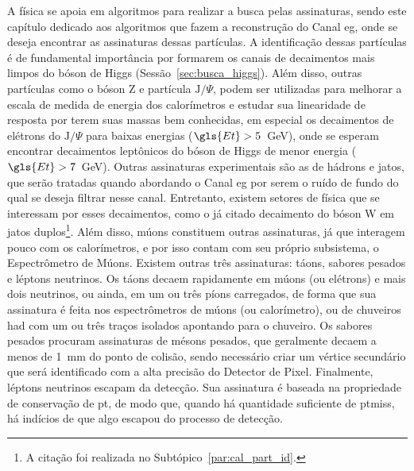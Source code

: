 A física se apoia em algoritmos
para realizar a busca pelas assinaturas, sendo este capítulo dedicado aos
algoritmos que fazem a reconstrução do Canal \gls{eg},
onde se deseja encontrar as assinaturas dessas partículas. A identificação
dessas partículas é de fundamental importância por formarem os canais de
decaimentos mais limpos do bóson de Higgs (Sessão~\ref{sec:busca_higgs}). Além
disso, outras partículas como o bóson Z e partícula $\text{J}/\Psi$, podem ser
utilizadas para melhorar a escala de medida de energia dos calorímetros e
estudar sua linearidade de resposta por terem suas massas bem conhecidas, 
em especial os decaimentos de elétrons do
$\text{J}/\Psi$ para baixas energias ($\gls{Et} > 5$~GeV), onde se esperam encontrar 
decaimentos leptônicos do bóson de Higgs de menor energia ($\gls{Et} > 7$~GeV).
Outras assinaturas experimentais são as de hádrons e jatos, que serão tratadas
quando abordando o Canal \gls{eg} por serem o ruído de fundo do qual se deseja
filtrar nesse canal. Entretanto, existem setores de física que se
interessam por esses decaimentos, como o já citado decaimento do bóson W em jatos
duplos\footnote{A citação foi realizada no Subtópico~\ref{par:cal_part_id}.}. 
Além disso, múons constituem outras assinaturas, já que interagem
pouco com os calorímetros, e por isso contam com seu próprio subsistema, o Espectrômetro de
Múons. Existem outras três assinaturas:
táons, sabores pesados e léptons neutrinos. Os táons decaem
rapidamente em múons (ou elétrons) e mais dois neutrinos, ou ainda, em um ou três
píons carregados, de forma que sua assinatura é
feita nos espectrômetros de múons (ou calorímetro), ou de chuveiros \gls{had} com um ou três
traços isolados apontando para o chuveiro. Os sabores pesados procuram
assinaturas de mésons pesados, que geralmente decaem a menos de 1~mm do ponto de
colisão, sendo necessário criar um vértice secundário que será identificado com
a alta precisão do Detector de Pixel. Finalmente, léptons neutrinos escapam da
detecção. Sua assinatura é baseada na propriedade de conservação de
\gls{pt}, de modo que, quando há quantidade suficiente de \gls{ptmiss}, há indícios
de que algo escapou do processo de detecção.

